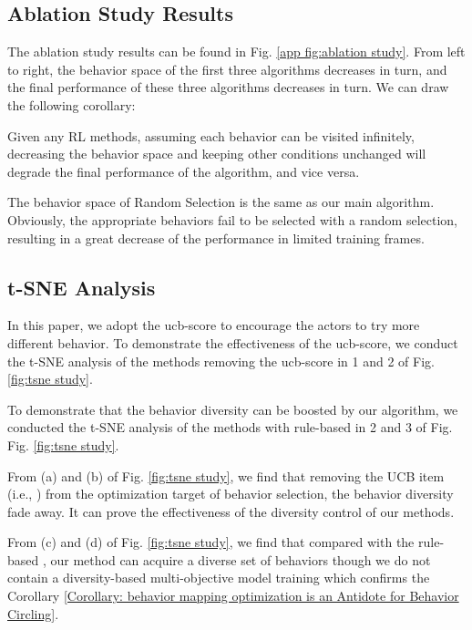 \subsection{Ablation Study Results}





The ablation study results can be found in Fig. \ref{app fig:ablation study}. From left to right, the behavior space of
the first three algorithms decreases in turn, and the final performance of these three algorithms decreases in turn. We can draw the following corollary:

\begin{Corollary}
\label{Corollary: Smaller Behavior Space, Lower Final Performance}
    Given any RL methods, assuming each behavior can be visited infinitely, decreasing the behavior space and keeping other conditions unchanged will degrade the final performance of the algorithm,  and vice versa.
\end{Corollary}

The behavior space of Random Selection is the same as our main algorithm. Obviously, the appropriate behaviors fail to be selected with a random selection, resulting in a great decrease of the performance in limited training frames.


\subsection{t-SNE Analysis}
\label{app: TSNE Analysis}



 In this paper, we adopt the ucb-score to encourage the actors to try more different behavior. To demonstrate the effectiveness of the ucb-score, we conduct the t-SNE analysis of the methods removing the ucb-score in 1 and 2 of  Fig. \ref{fig:tsne study}. 

 To demonstrate that the behavior diversity can be boosted by our algorithm, we conducted  the t-SNE analysis of the methods with rule-based  in 2 and 3 of Fig. Fig. \ref{fig:tsne study}. 
 
 
From (a) and (b) of Fig. \ref{fig:tsne study}, we find that removing the UCB item (i.e., ) from the optimization target of behavior selection, the behavior diversity fade away. It can prove the effectiveness of the diversity control of our methods.


From (c) and (d) of Fig. \ref{fig:tsne study}, we find that compared with the rule-based , our method can acquire a diverse set of behaviors though we do not contain a diversity-based multi-objective model training which confirms the Corollary \ref{Corollary: behavior mapping optimization is an Antidote for Behavior Circling}.





